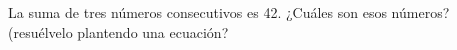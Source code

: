 \documentclass[addpoints,spanish, 12pt,a4paper]{exam}
\begin{document}
\begin{questions}





\question[2]
La suma de tres números consecutivos es 42. ¿Cuáles son esos números? (resuélvelo plantendo una ecuación?\vspace{150pt}


% 


\end{questions}
\end{document}
